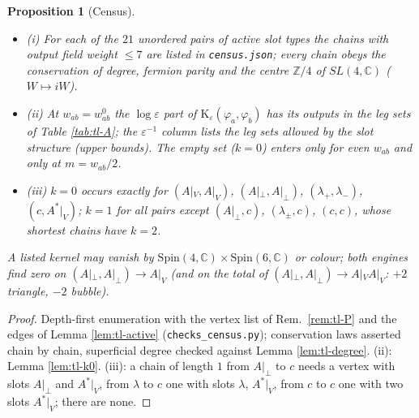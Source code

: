 \documentclass[11pt]{article}
\numberwithin{equation}{section}
\theoremstyle{plain}
\newtheorem{proposition}[theorem]{Proposition}
\theoremstyle{definition}
\begin{document}
\begin{proposition}[Census]
\label{prop:tl-census}
\begin{itemize}
\item (i) For each of the $21$ unordered pairs of active slot types the chains with output field weight $\le7$ are listed in \texttt{census.json}; every chain obeys the conservation of degree, fermion parity and the centre $\mathbb Z/4$ of $SL(4,\mathbb C)$ ($W\mapsto iW$).
\item (ii) At $w_{ab}=w^0_{ab}$ the $\log\varepsilon$ part of $\mathrm K_\varepsilon(\varphi_a,\varphi_b)$ has its outputs in the leg sets of Table \ref{tab:tl-A}; the $\varepsilon^{-1}$ column lists the leg sets allowed by the slot structure (upper bounds). The empty set ($k=0$) enters only for even $w_{ab}$ and only at $m=w_{ab}/2$.
\item (iii) $k=0$ occurs exactly for $(A|_V,A|_V)$, $(A|_\perp,A|_\perp)$, $(\lambda_+,\lambda_-)$, $(c,A^*|_V)$; $k=1$ for all pairs except $(A|_\perp,c)$, $(\lambda_\pm,c)$, $(c,c)$, whose shortest chains have $k=2$.
\end{itemize}
A listed kernel may vanish by $\mathrm{Spin}(4,\mathbb C)\times\mathrm{Spin}(6,\mathbb C)$ or colour; both engines find zero on $(A|_\perp,A|_\perp)\to A|_V$ (and on the total of $(A|_\perp,A|_\perp)\to A|_VA|_V$: $+2$ triangle, $-2$ bubble).
\end{proposition}

\begin{proof}
Depth-first enumeration with the vertex list of Rem.~\ref{rem:tl-P} and the edges of Lemma \ref{lem:tl-active} (\texttt{checks\_census.py}); conservation laws asserted chain by chain, superficial degree checked against Lemma \ref{lem:tl-degree}. (ii): Lemma \ref{lem:tl-k0}. (iii): a chain of length $1$ from $A|_\perp$ to $c$ needs a vertex with slots $A|_\perp$ and $A^*|_V$, from $\lambda$ to $c$ one with slots $\lambda$, $A^*|_V$, from $c$ to $c$ one with two slots $A^*|_V$; there are none.
\end{proof}
\end{document}
